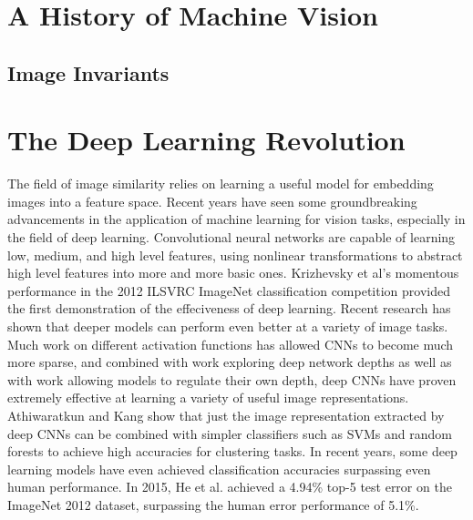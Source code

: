
\section{A History of Machine Vision}

\subsection{Image Invariants}

\section{The Deep Learning Revolution}
The field of image similarity relies on learning a useful model for embedding images into a feature space. Recent years have seen some groundbreaking advancements in the application of machine learning for vision tasks, especially in the field of deep learning. Convolutional neural networks\cite{lecun1989backpropagation} are capable of learning low, medium, and high level features, using nonlinear transformations to abstract high level features into more and more basic ones. Krizhevsky et al's momentous performance in the 2012 ILSVRC ImageNet classification competition provided the first demonstration of the effeciveness of deep learning.\cite{krizhevsky2012imagenet} Recent research has shown that deeper models can perform even better at a variety of image tasks.\cite{szegedy2015going} Much work on different activation functions has allowed CNNs to become much more sparse, and combined with work exploring deep network depths\cite{simonyan2014very}\cite{szegedy2015going} as well as with work allowing models to regulate their own depth\cite{he2016deep}, deep CNNs have proven extremely effective at learning a variety of useful image representations. Athiwaratkun and Kang show that just the image representation extracted by deep CNNs can be combined with simpler classifiers such as SVMs and random forests to achieve high accuracies for clustering tasks.\cite{athiwaratkun2015feature} In recent years, some deep learning models have even achieved classification accuracies surpassing even human performance. In 2015, He et al. achieved a 4.94\% top-5 test error on the ImageNet 2012 dataset, surpassing the human error performance of 5.1\%\cite{he2016deep}.

